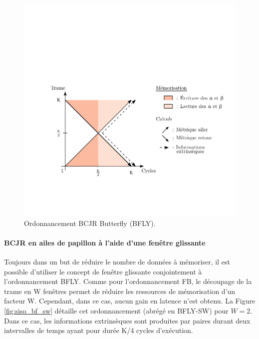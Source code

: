\begin{figure}[h]
	\centering
	\includegraphics{main/ch4_fig/ipe/BFLY+LEG.pdf}
	\caption{Ordonnancement BCJR Butterfly (BFLY). \label{fig:siso_but}}
\end{figure}
\vspace*{-1em}

\paragraph*{BCJR en ailes de papillon à l'aide d'une fenêtre glissante}
Toujours dans un but de réduire le nombre de données à mémoriser, il est possible d'utiliser le concept de fenêtre 
glissante conjointement à l'ordonnancement BFLY. Comme pour l'ordonnancement FB, le découpage de la trame en W fenêtres 
permet de réduire les ressources de mémorisation d'un facteur W. Cependant, dans ce cas, aucun gain en latence n'est obtenu. La Figure \ref{fig:siso_bf_sw} détaille cet ordonnancement (abrégé en BFLY-SW) pour $W = 2$. Dans ce cas, 
les informations extrinsèques sont produites par paires durant deux intervalles de temps ayant pour durée K/4 cycles 
d'exécution.


